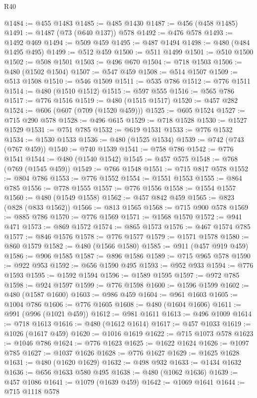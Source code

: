 \begin{lexlean}{R40}
\begin{coremodule}
{{{{{{{{{{{{{{{{{{{{{{{{{{{{{{{{{{{{{{{{{{{{{{{{{{{{{{{{{{{{{{{{{{{{{{{{{{{{{{{{{{{{{{{{{{{{{{{{{{{{{{{{{{{{{@1484 := @455 @1483
@1485 := @485 @1430
@1487 := @456 (@458 @1485)
@1491 := @1487 (@73 (@640 @137)) @578
@1492 := @476 @578
@1493 := @1492 @469
@1494 := @509 @459
@1495 := @487 @1494
@1498 := @480 (@484 @1495 @495)
@1499 := @512 @459
@1500 := @511 @1499
@1501 := @510 @1500
@1502 := @508 @1501
@1503 := @496 @670
@1504 := @718 @1503
@1506 := @480 (@1502 @1504)
@1507 := @547 @459
@1508 := @514 @1507
@1509 := @513 @1508
@1510 := @546 @1509
@1511 := @535 @786
@1512 := @776 @1511
@1514 := @480 (@1510 @1512)
@1515 := @597 @555
@1516 := @565 @786
@1517 := @776 @1516
@1519 := @480 (@1515 @1517)
@1520 := @457 @282
@1524 := @606 (@607 (@709 (@1520 @459)))
@1525 := @605 @1524
@1527 := @715 @290 @578
@1528 := @496 @615
@1529 := @718 @1528
@1530 := @1527 @1529
@1531 := @751 @785
@1532 := @619 @1531
@1533 := @776 @1532
@1534 := @1530 @1533
@1536 := @480 (@1525 @1534)
@1539 := @742 (@743 (@767 @459))
@1540 := @740 @1539
@1541 := @758 @786
@1542 := @776 @1541
@1544 := @480 (@1540 @1542)
@1545 := @457 @575
@1548 := @768 (@769 (@1545 @459))
@1549 := @766 @1548
@1551 := @715 @817 @578
@1552 := @804 @786
@1553 := @776 @1552
@1554 := @1551 @1553
@1555 := @864 @785
@1556 := @778 @1555
@1557 := @776 @1556
@1558 := @1554 @1557
@1560 := @480 (@1549 @1558)
@1562 := @457 @842 @459
@1565 := @823 (@828 (@833 @1562))
@1566 := @813 @1565
@1568 := @715 @900 @578
@1569 := @885 @786
@1570 := @776 @1569
@1571 := @1568 @1570
@1572 := @941 @471
@1573 := @869 @1572
@1574 := @865 @1573
@1576 := @467 @1574 @785
@1577 := @846 @1576
@1578 := @776 @1577
@1579 := @1571 @1578
@1580 := @860 @1579
@1582 := @480 (@1566 @1580)
@1585 := @911 (@457 @919 @459)
@1586 := @906 @1585
@1587 := @896 @1586
@1589 := @715 @965 @578
@1590 := @922 @953
@1592 := @656 @1590 @495
@1593 := @952 @933
@1594 := @776 @1593
@1595 := @1592 @1594
@1596 := @1589 @1595
@1597 := @972 @785
@1598 := @924 @1597
@1599 := @776 @1598
@1600 := @1596 @1599
@1602 := @480 (@1587 @1600)
@1603 := @986 @459
@1604 := @961 @1603
@1605 := @1004 @786
@1606 := @776 @1605
@1608 := @480 (@1604 @1606)
@1611 := @991 (@996 (@1021 @459))
@1612 := @981 @1611
@1613 := @496 @1009
@1614 := @718 @1613
@1616 := @480 (@1612 @1614)
@1617 := @457 @1033
@1619 := @1026 (@1617 @459)
@1620 := @1016 @1619
@1622 := @715 @1073 @578
@1623 := @1046 @786
@1624 := @776 @1623
@1625 := @1622 @1624
@1626 := @1097 @785
@1627 := @1037 @1626
@1628 := @776 @1627
@1629 := @1625 @1628
@1631 := @480 (@1620 @1629)
@1632 := @498 @932
@1633 := @1434 @1632
@1636 := @656 @1633 @580 @495
@1638 := @480 (@1062 @1636)
@1639 := @457 @1086
@1641 := @1079 (@1639 @459)
@1642 := @1069 @1641
@1644 := @715 @1118 @578
}}}}}}}}}}}}}}}}}}}}}}}}}}}}}}}}}}}}}}}}}}}}}}}}}}}}}}}}}}}}}}}}}}}}}}}}}}}}}}}}}}}}}}}}}}}}}}}}}}}}}}}}}}}}}
\end{coremodule}
\end{lexlean}
